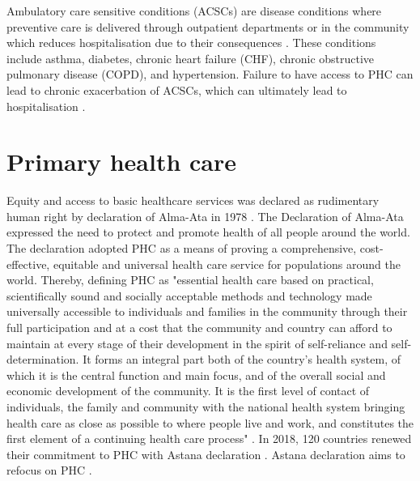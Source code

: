 Ambulatory care sensitive conditions (ACSCs) are disease conditions where preventive care is delivered through outpatient departments or in the community which reduces hospitalisation due to their consequences \cite{ansari2012patient,ansari2002victorian,millman1993access}.  These conditions include asthma, diabetes, chronic heart failure (CHF), chronic obstructive pulmonary disease (COPD), and hypertension. Failure to have access to PHC can lead to chronic exacerbation of ACSCs, which can ultimately lead to hospitalisation \cite{ansari2012patient,ansari2002victorian,millman1993access}.

\section{Primary health care}

Equity and access to basic healthcare services was declared as rudimentary human right by declaration of Alma-Ata in 1978 \cite{Alma:ata:declaration}. The Declaration of Alma-Ata \citeyear{Alma:ata:declaration} expressed the need to protect and promote health of all people around the world. The declaration adopted PHC as a means of proving a comprehensive, cost-effective, equitable and universal health care service for populations around the world. Thereby, defining PHC as "essential health care based on practical, scientifically sound and socially acceptable methods and technology made universally accessible to individuals  and families in the community through their full participation and at a cost that the community and country can afford to maintain at every stage of their development in the spirit of self-reliance and self-determination. It forms an integral part both of the country's health system, of which it is the central function and main focus, and of the overall social and economic development of the community. It is the first level of contact of individuals, the family and community with the national health system bringing health care as close as possible to where people live and work, and constitutes the first element of a continuing health care process" \cite{Alma:ata:declaration}. In 2018, 120 countries renewed their commitment to PHC with Astana declaration \cite{walraven20192018}. Astana declaration aims to refocus on PHC \cite{Astana:PHC:action}.

